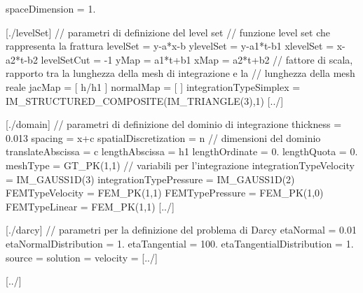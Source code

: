 \begin{Code03_01}[caption={Definizione della frattura}]
[fractureData]

spaceDimension = 1.

   [./levelSet]		// parametri di definizione del level set
     // funzione level set che rappresenta la frattura
     levelSet = y-a*x-b 			
     ylevelSet = y-a1*t-b1 			
     xlevelSet = x-a2*t-b2				          
     levelSetCut = -1	
     yMap = a1*t+b1					
     xMap = a2*t+b2				
     // fattore di scala, rapporto tra la lunghezza della mesh di integrazione e la 
     // lunghezza della mesh reale
     jacMap = [ h/h1 ]				
     normalMap = [ ]					
     integrationTypeSimplex = IM_STRUCTURED_COMPOSITE(IM_TRIANGLE(3),1)
   [../]

   [./domain]		// parametri di definizione del dominio di integrazione
     thickness = 0.013
     spacing = x+c      	
     spatialDiscretization = n
     // dimensioni del dominio
     translateAbscissa = c
     lengthAbscissa = h1
     lengthOrdinate = 0.
     lengthQuota = 0.
     meshType = GT_PK(1,1)
     // variabili per l'integrazione
     integrationTypeVelocity = IM_GAUSS1D(3)
     integrationTypePressure = IM_GAUSS1D(2)		
     FEMTypeVelocity = FEM_PK(1,1)
     FEMTypePressure = FEM_PK(1,0)
     FEMTypeLinear = FEM_PK(1,1)
   [../]

   [./darcy]		// parametri per la definizione del problema di Darcy
     etaNormal = 0.01
     etaNormalDistribution = 1. 
     etaTangential = 100.
     etaTangentialDistribution = 1.
     source = 
     solution = 
     velocity = 
   [../]

[../]

\end{Code03_01}






